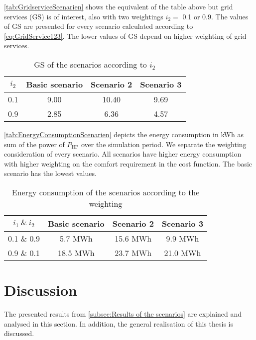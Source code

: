 \autoref{tab:GridserviceScenarien} shows the equivalent of the table above but grid services (GS) is of interest, also with two weightings  $i_\text{2} =$ 0.1 or 0.9. The values of GS are presented for every scenario calculated according to \autoref{eq:GridService123}. The lower values of GS depend on higher weighting of grid services. 
    \begin{table}[H]
        \centering
        \begin{tabular}{c||c|c|c}
          $i_\text{2}$  &  Basic scenario & Scenario 2 & Scenario 3\\
          \hline  \hline
             0.1 & 9.00 & 10.40 & 9.69 \\
             0.9 & 2.85 & 6.36 & 4.57\\
        \end{tabular}
        \caption{GS of the scenarios according to $i_\text{2}$}
        \label{tab:GridserviceScenarien}
    \end{table}
    
\autoref{tab:EnergyConsumptionScenarien} depicts the energy consumption in kWh as sum of the power of $P_\text{HP}$ over the simulation period. We separate the weighting consideration of every scenario. All scenarios have higher energy consumption with higher weighting on the comfort requirement in the cost function. The basic scenario has the lowest values. 
    \begin{table}[H]
        \centering
        \begin{tabular}{c||c|c|c}
          $i_\text{1} \ \& \  i_\text{2}$  &  Basic scenario & Scenario 2 & Scenario 3\\
          \hline  \hline
             0.1 \& 0.9 & 5.7 MWh & 15.6 MWh & 9.9 MWh\\
             0.9 \& 0.1 & 18.5 MWh & 23.7 MWh & 21.0 MWh\\
        \end{tabular}
        \caption{Energy consumption of the scenarios according to the weighting}
        \label{tab:EnergyConsumptionScenarien}
    \end{table}

\section{Discussion}
\label{sec:discussion}
The presented results from \autoref{subsec:Results of the scenarios} are explained and analysed in this section. In addition, the general realisation of this thesis is discussed.

